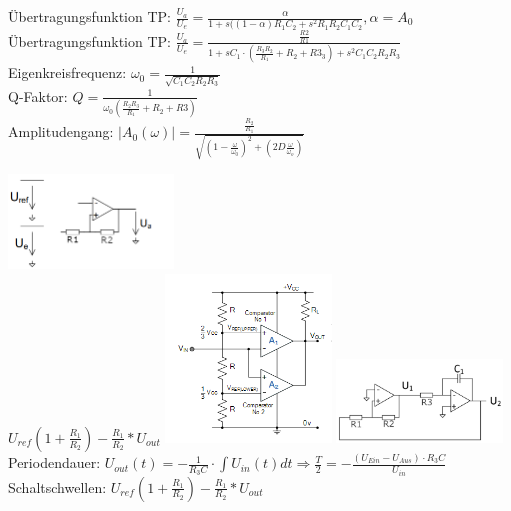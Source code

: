 \documentclass[A4]{scrreprt}
\begin{document}
  Übertragungsfunktion TP: $\frac{U_a}{U_e} = \frac{\alpha}{1+s((1-\alpha)R_1C_2+s^2R_1R_2C_1C_2}, \alpha = A_0$\\
  
  Übertragungsfunktion TP: $\frac{U_a}{U_e} = \frac{\frac{R2}{R1}}{1+sC_1\cdot (\frac{R_3 R_2}{R_1} + R_2 + R3_3) + s^2C_1C_2R_2R_3 }$\\
  Eigenkreisfrequenz: $\omega_0 = \frac{1}{\sqrt{C_1C_2R_2R_3}}$\\
  Q-Faktor: $Q = \frac{1}{\omega_0 (\frac{R_2R_3}{R_1}+R_2+R3)}$\\
  Amplitudengang: $|A_0(\omega)| = \frac{\frac{R_2}{R_1}}{\sqrt{(1-\frac{\omega}{\omega_0})^2+(2D\frac{\omega}{\omega_o})}}$

  \includegraphics[width=0.33\textwidth]{Komparator.png}\\
  $U_{ref}(1+\frac{R_1}{R_2})-\frac{R_1}{R_2}*U_{out}$
  \includegraphics[width=0.33\textwidth]{Fensterkomparator.png}
  \includegraphics[width=0.33\textwidth]{Rechteck_Dreieck_Generator.png}\\
  Periodendauer: $U_{out}(t) = -\frac{1}{R_3C}\cdot\int U_{in}(t)dt \Rightarrow \frac{T}{2} = -\frac{(U_{Ein}-U_{Aus})\cdot R_3C}{U_{in}}$\\ %
  Schaltschwellen: $U_{ref}(1+\frac{R_1}{R_2})-\frac{R_1}{R_2}*U_{out}$\\
\end{document}
